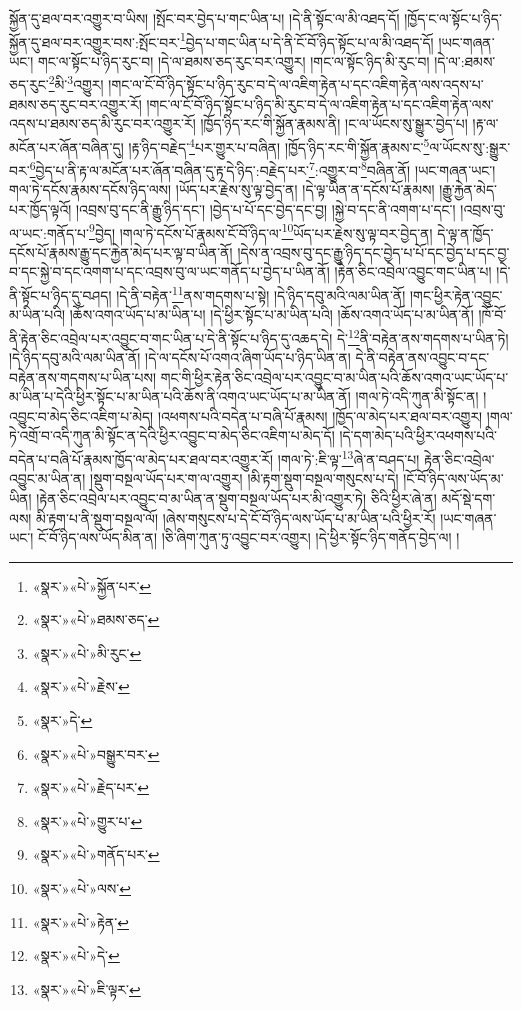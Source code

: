 སྐྱོན་དུ་ཐལ་བར་འགྱུར་བ་ཡིས། །སྤོང་བར་བྱེད་པ་གང་ཡིན་པ། །དེ་ནི་སྟོང་ལ་མི་འཐད་དོ། །ཁྱོད་ང་ལ་སྟོང་པ་ཉིད་སྐྱོན་དུ་ཐལ་བར་འགྱུར་བས་:སྤོང་བར་\footnote{«སྣར་»«པེ་»སྐྱོན་པར་}བྱེད་པ་གང་ཡིན་པ་དེ་ནི་ངོ་བོ་ཉིད་སྟོང་པ་ལ་མི་འཐད་དོ། །ཡང་གཞན་ཡང་། གང་ལ་སྟོང་པ་ཉིད་རུང་བ། །དེ་ལ་ཐམས་ཅད་རུང་བར་འགྱུར། །གང་ལ་སྟོང་ཉིད་མི་རུང་བ། །དེ་ལ་:ཐམས་ཅད་རུང་\footnote{«སྣར་»«པེ་»ཐམས་ཅད་}མི་\footnote{«སྣར་»«པེ་»མི་རུང་}འགྱུར། །གང་ལ་ངོ་བོ་ཉིད་སྟོང་པ་ཉིད་རུང་བ་དེ་ལ་འཇིག་རྟེན་པ་དང་འཇིག་རྟེན་ལས་འདས་པ་ཐམས་ཅད་རུང་བར་འགྱུར་རོ། །གང་ལ་ངོ་བོ་ཉིད་སྟོང་པ་ཉིད་མི་རུང་བ་དེ་ལ་འཇིག་རྟེན་པ་དང་འཇིག་རྟེན་ལས་འདས་པ་ཐམས་ཅད་མི་རུང་བར་འགྱུར་རོ། །ཁྱོད་ཉིད་རང་གི་སྐྱོན་རྣམས་ནི། །ང་ལ་ཡོངས་སུ་སྒྱུར་བྱེད་པ། །རྟ་ལ་མངོན་པར་ཞོན་བཞིན་དུ། །རྟ་ཉིད་བརྗེད་\footnote{«སྣར་»«པེ་»རྗེས་}པར་གྱུར་པ་བཞིན། །ཁྱོད་ཉིད་རང་གི་སྐྱོན་རྣམས་ང་\footnote{«སྣར་»དེ་}ལ་ཡོངས་སུ་:སྒྱུར་བར་\footnote{«སྣར་»«པེ་»བསྒྱུར་བར་}བྱེད་པ་ནི་རྟ་ལ་མངོན་པར་ཞོན་བཞིན་དུ་རྟ་དེ་ཉིད་:བརྗེད་པར་\footnote{«སྣར་»«པེ་»རྗེད་པར་}:འགྱུར་བ་\footnote{«སྣར་»«པེ་»གྱུར་པ་}བཞིན་ནོ། །ཡང་གཞན་ཡང་། གལ་ཏེ་དངོས་རྣམས་དངོས་ཉིད་ལས། །ཡོད་པར་རྗེས་སུ་ལྟ་བྱེད་ན། །དེ་ལྟ་ཡིན་ན་དངོས་པོ་རྣམས། །རྒྱུ་རྐྱེན་མེད་པར་ཁྱོད་ལྟའོ། །འབྲས་བུ་དང་ནི་རྒྱུ་ཉིད་དང་། །བྱེད་པ་པོ་དང་བྱེད་དང་བྱ། །སྐྱེ་བ་དང་ནི་འགག་པ་དང་། །འབྲས་བུ་ལ་ཡང་:གནོད་པ་\footnote{«སྣར་»«པེ་»གནོད་པར་}བྱེད། །གལ་ཏེ་དངོས་པོ་རྣམས་ངོ་བོ་ཉིད་ལ་\footnote{«སྣར་»«པེ་»ལས་}ཡོད་པར་རྗེས་སུ་ལྟ་བར་བྱེད་ན། དེ་ལྟ་ན་ཁྱོད་དངོས་པོ་རྣམས་རྒྱུ་དང་རྐྱེན་མེད་པར་ལྟ་བ་ཡིན་ནོ། །དེས་ན་འབྲས་བུ་དང་རྒྱུ་ཉིད་དང་བྱེད་པ་པོ་དང་བྱེད་པ་དང་བྱ་བ་དང་སྐྱེ་བ་དང་འགག་པ་དང་འབྲས་བུ་ལ་ཡང་གནོད་པ་བྱེད་པ་ཡིན་ནོ། །རྟེན་ཅིང་འབྲེལ་འབྱུང་གང་ཡིན་པ། །དེ་ནི་སྟོང་པ་ཉིད་དུ་བཤད། །དེ་ནི་བརྟེན་\footnote{«སྣར་»«པེ་»རྟེན་}ནས་གདགས་པ་སྟེ། །དེ་ཉིད་དབུ་མའི་ལམ་ཡིན་ནོ། །གང་ཕྱིར་རྟེན་འབྱུང་མ་ཡིན་པའི། །ཆོས་འགའ་ཡོད་པ་མ་ཡིན་པ། །དེ་ཕྱིར་སྟོང་པ་མ་ཡིན་པའི། །ཆོས་འགའ་ཡོད་པ་མ་ཡིན་ནོ། །ཁོ་བོ་ནི་རྟེན་ཅིང་འབྲེལ་པར་འབྱུང་བ་གང་ཡིན་པ་དེ་ནི་སྟོང་པ་ཉིད་དུ་འཆད་དེ། དེ་\footnote{«སྣར་»«པེ་»དེ་}ནི་བརྟེན་ནས་གདགས་པ་ཡིན་ཏེ། །དེ་ཉིད་དབུ་མའི་ལམ་ཡིན་ནོ། །དེ་ལ་དངོས་པོ་འགའ་ཞིག་ཡོད་པ་ཉིད་ཡིན་ན། དེ་ནི་བརྟེན་ནས་འབྱུང་བ་དང་བརྟེན་ནས་གདགས་པ་ཡིན་པས། གང་གི་ཕྱིར་རྟེན་ཅིང་འབྲེལ་པར་འབྱུང་བ་མ་ཡིན་པའི་ཆོས་འགའ་ཡང་ཡོད་པ་མ་ཡིན་པ་དེའི་ཕྱིར་སྟོང་པ་མ་ཡིན་པའི་ཆོས་ནི་འགའ་ཡང་ཡོད་པ་མ་ཡིན་ནོ། །གལ་ཏེ་འདི་ཀུན་མི་སྟོང་ན། །འབྱུང་བ་མེད་ཅིང་འཇིག་པ་མེད། །འཕགས་པའི་བདེན་པ་བཞི་པོ་རྣམས། །ཁྱོད་ལ་མེད་པར་ཐལ་བར་འགྱུར། །གལ་ཏེ་འགྲོ་བ་འདི་ཀུན་མི་སྟོང་ན་དེའི་ཕྱིར་འབྱུང་བ་མེད་ཅིང་འཇིག་པ་མེད་དོ། །དེ་དག་མེད་པའི་ཕྱིར་འཕགས་པའི་བདེན་པ་བཞི་པོ་རྣམས་ཁྱོད་ལ་མེད་པར་ཐལ་བར་འགྱུར་རོ། །གལ་ཏེ་:ཇི་ལྟ་\footnote{«སྣར་»«པེ་»ཇི་ལྟར་}ཞེ་ན་བཤད་པ། རྟེན་ཅིང་འབྲེལ་འབྱུང་མ་ཡིན་ན། །སྡུག་བསྔལ་ཡོད་པར་ག་ལ་འགྱུར། །མི་རྟག་སྡུག་བསྔལ་གསུངས་པ་དེ། །ངོ་བོ་ཉིད་ལས་ཡོད་མ་ཡིན། །རྟེན་ཅིང་འབྲེལ་པར་འབྱུང་བ་མ་ཡིན་ན་སྡུག་བསྔལ་ཡོད་པར་མི་འགྱུར་ཏེ། ཅིའི་ཕྱིར་ཞེ་ན། མདོ་སྡེ་དག་ལས། མི་རྟག་པ་ནི་སྡུག་བསྔལ་ལོ། །ཞེས་གསུངས་པ་དེ་ངོ་བོ་ཉིད་ལས་ཡོད་པ་མ་ཡིན་པའི་ཕྱིར་རོ། །ཡང་གཞན་ཡང་། ངོ་བོ་ཉིད་ལས་ཡོད་མིན་ན། །ཅི་ཞིག་ཀུན་ཏུ་འབྱུང་བར་འགྱུར། །དེ་ཕྱིར་སྟོང་ཉིད་གནོད་བྱེད་ལ། །
